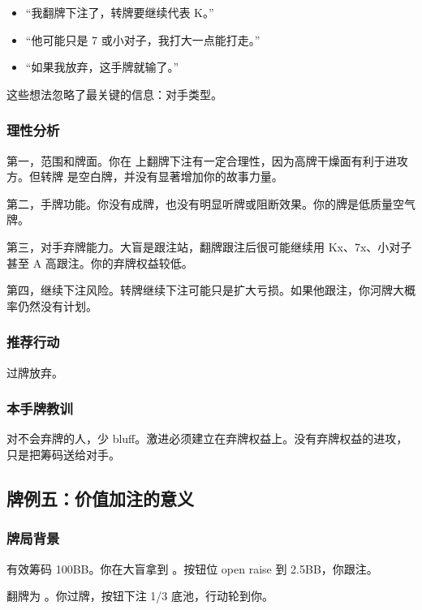 \begin{itemize}
\item “我翻牌下注了，转牌要继续代表 K。”
\item “他可能只是 7 或小对子，我打大一点能打走。”
\item “如果我放弃，这手牌就输了。”
\end{itemize}

这些想法忽略了最关键的信息：对手类型。

\subsubsection*{理性分析}

第一，范围和牌面。你在  上翻牌下注有一定合理性，因为高牌干燥面有利于进攻方。但转牌  是空白牌，并没有显著增加你的故事力量。

第二，手牌功能。你没有成牌，也没有明显听牌或阻断效果。你的牌是低质量空气牌。

第三，对手弃牌能力。大盲是跟注站，翻牌跟注后很可能继续用 Kx、7x、小对子甚至 A 高跟注。你的弃牌权益较低。

第四，继续下注风险。转牌继续下注可能只是扩大亏损。如果他跟注，你河牌大概率仍然没有计划。

\subsubsection*{推荐行动}

过牌放弃。

\subsubsection*{本手牌教训}

对不会弃牌的人，少 bluff。激进必须建立在弃牌权益上。没有弃牌权益的进攻，只是把筹码送给对手。

\subsection{牌例五：价值加注的意义}

\subsubsection*{牌局背景}

有效筹码 100BB。你在大盲拿到 。按钮位 open raise 到 2.5BB，你跟注。

翻牌为 。你过牌，按钮下注 1/3 底池，行动轮到你。

